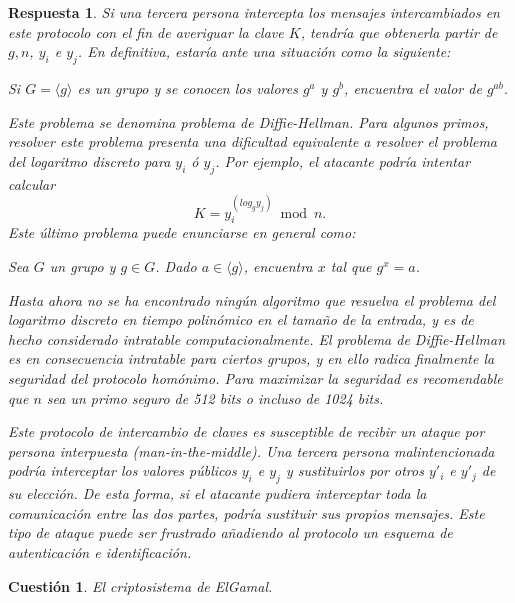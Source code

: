 \documentclass[
  a4paper,
  spanish,
  12pt,
]{scrartcl}
\theoremstyle{ejercicio-style}
\newtheorem{ejer}{Cuestión}
\theoremstyle{remark-style}
\newtheorem*{sol}{Respuesta}
\theoremstyle{teorema-style}
\begin{document}
\begin{sol}
  Si una tercera persona intercepta los mensajes intercambiados en este protocolo con el fin de averiguar la clave \(K\), tendría que obtenerla partir de $g, n$, \(y_i\) e \(y_j\). En definitiva, estaría ante una situación como la siguiente:
  \begin{displayquote}
    Si \(G = \langle g \rangle\) es un grupo y se conocen los valores $g^a$ y $g^b$, encuentra el valor de $g^{ab}$.
  \end{displayquote}
  Este problema se denomina \textit{problema de Diffie-Hellman}.
  Para algunos primos, resolver este problema presenta una dificultad equivalente a resolver el \textit{problema del logaritmo discreto} para \(y_i\) ó \(y_j\). Por ejemplo, el atacante podría intentar calcular \[K = y_i^{\left(log_{g} y_j\right)} \bmod n.\] Este último problema puede enunciarse en general como: \begin{displayquote}
    Sea \(G\) un grupo y \(g \in G\). Dado \(a \in \langle g \rangle\), encuentra \(x\) tal que \(g^x = a\).
  \end{displayquote}

  Hasta ahora no se ha encontrado ningún algoritmo que resuelva el problema del logaritmo discreto en tiempo polinómico en el tamaño de la entrada, y es de hecho considerado intratable computacionalmente.
  El problema de Diffie-Hellman es en consecuencia intratable para ciertos grupos, y en ello radica finalmente la seguridad del protocolo homónimo. Para maximizar la seguridad es recomendable que $n$ sea un \textit{primo seguro} de 512 bits o incluso de 1024 bits.

    Este protocolo de intercambio de claves es susceptible de recibir un ataque por persona interpuesta (\textit{man-in-the-middle}). Una tercera persona malintencionada podría interceptar los valores públicos $y_i$ e $y_j$ y sustituirlos por otros $y'_i$ e $y'_j$ de su elección. De esta forma, si el atacante pudiera interceptar toda la comunicación entre las dos partes, podría sustituir sus propios mensajes. Este tipo de ataque puede ser frustrado añadiendo al protocolo un esquema de autenticación e identificación.
\end{sol}

\begin{ejer}
  El criptosistema de ElGamal.
\end{ejer}
\end{document}
